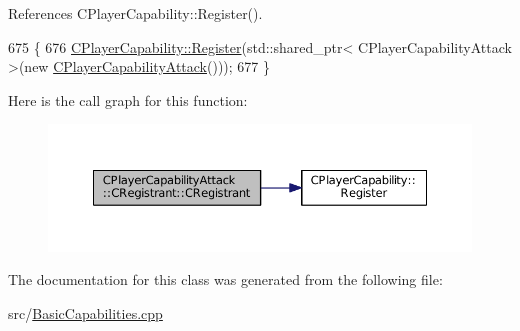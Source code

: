 References C\+Player\+Capability\+::\+Register().


\begin{DoxyCode}
675                                                \{
676     \hyperlink{classCPlayerCapability_a7e298018dcde2684451add3cfff065f7}{CPlayerCapability::Register}(std::shared\_ptr< CPlayerCapabilityAttack >(\textcolor{keyword}{new} 
      \hyperlink{classCPlayerCapabilityAttack_ae9430ec5ce80a461030603c5cab0525c}{CPlayerCapabilityAttack}()));   
677 \}
\end{DoxyCode}
Here is the call graph for this function\+:\nopagebreak
\begin{figure}[H]
\begin{center}
\leavevmode
\includegraphics[width=350pt]{classCPlayerCapabilityAttack_1_1CRegistrant_afe5887c5ba5ae7d0b65e4820d6f9143e_cgraph}
\end{center}
\end{figure}


The documentation for this class was generated from the following file\+:\begin{DoxyCompactItemize}
\item 
src/\hyperlink{BasicCapabilities_8cpp}{Basic\+Capabilities.\+cpp}\end{DoxyCompactItemize}
